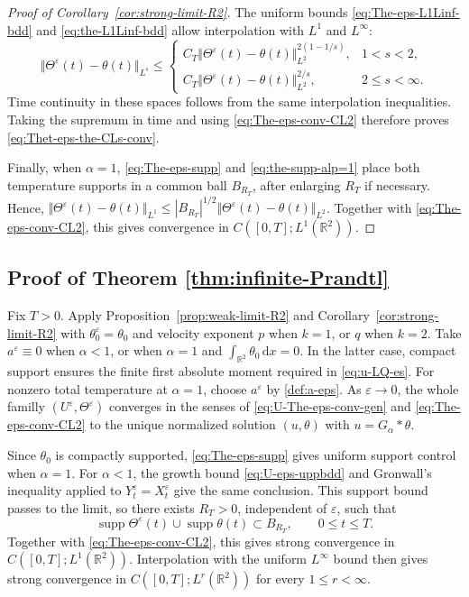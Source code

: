\documentclass[reqno,11pt,a4paper]{amsart}
\newcommand{\dd}{\mathrm{d}}
\begin{document}
\begin{proof}[Proof of Corollary~\ref{cor:strong-limit-R2}]
The uniform bounds
\eqref{eq:The-eps-L1Linf-bdd}
and \eqref{eq:the-L1Linf-bdd}
allow interpolation with $L^1$ and $L^\infty$:
\[
  \Vert \Theta^\varepsilon(t)-\theta(t)\Vert _{L^s}
  \leq
  \begin{cases}
    C_T\Vert \Theta^\varepsilon(t)-\theta(t)\Vert _{L^2}^
      {2(1-1/s)},
      &1<s<2,\\[1mm]
    C_T\Vert \Theta^\varepsilon(t)-\theta(t)\Vert _{L^2}^{2/s},
      &2\leq s<\infty.
  \end{cases}
\]
Time continuity in these spaces follows from
the same interpolation inequalities.
Taking the supremum in time and using
\eqref{eq:The-eps-conv-CL2}
therefore proves \eqref{eq:Thet-eps-the-CLs-conv}.

Finally, when $\alpha=1$,
\eqref{eq:The-eps-supp}
and \eqref{eq:the-supp-alp=1}
place both temperature supports in a common ball
$B_{R_T}$, after enlarging $R_T$ if necessary.
Hence,
$\Vert \Theta^\varepsilon(t)-\theta(t)\Vert _{L^1}\leq |B_{R_T}|^{1/2}
  \Vert \Theta^\varepsilon(t)-\theta(t)\Vert _{L^2}$.
Together with \eqref{eq:The-eps-conv-CL2},
this gives convergence in
$C([0,T];L^1(\mathbb R^2))$.
\end{proof}

\subsection{Proof of Theorem \ref{thm:infinite-Prandtl}}

Fix $T>0$.
Apply Proposition~\ref{prop:weak-limit-R2}
and Corollary~\ref{cor:strong-limit-R2}
with $\theta_0^\varepsilon=\theta_0$
and velocity exponent $p$ when $k=1$,
or $q$ when $k=2$.
Take $a^\varepsilon\equiv0$ when $\alpha<1$,
or when $\alpha=1$ and
$\int_{\mathbb R^2}\theta_0\,\dd x=0$.
In the latter case, compact support ensures
the finite first absolute moment required
in \eqref{eq:u-LQ-es}.
For nonzero total temperature at $\alpha=1$,
choose $a^\varepsilon$ by \eqref{def:a-eps}.
As $\varepsilon\to0$, the whole familly
$(U^\varepsilon,\Theta^\varepsilon)$ converges
in the senses of \eqref{eq:U-The-eps-conv-gen}
and \eqref{eq:The-eps-conv-CL2}
to the unique normalized solution $(u,\theta)$
with $u=G_\alpha*\theta$.

Since $\theta_0$ is compactly supported,
\eqref{eq:The-eps-supp} gives uniform support control
when $\alpha=1$.
For $\alpha<1$, the growth bound
\eqref{eq:U-eps-uppbdd} and Gronwall's inequality
applied to $Y_t^\varepsilon=X_t^\varepsilon$
give the same conclusion.
This support bound passes to the limit, so
there exists $R_T>0$, independent of $\varepsilon$,
such that
\begin{equation}\label{eq:limit-temperature-support}
  \operatorname{supp}\Theta^\varepsilon(t)
  \cup\operatorname{supp}\theta(t)
  \subset B_{R_T},
  \qquad 0\leq t\leq T.
\end{equation}
Together with \eqref{eq:The-eps-conv-CL2},
this gives strong convergence in
$C([0,T];L^1(\mathbb R^2))$.
Interpolation with the uniform $L^\infty$ bound
then gives strong convergence in
$C([0,T];L^r(\mathbb R^2))$
for every $1\leq r<\infty$.
\end{document}
